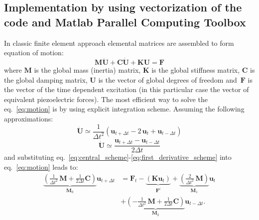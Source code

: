 \documentclass[preprint,12pt]{elsarticle}
\renewcommand{\vec}[1]{\mathbf{#1}}
\renewcommand{\bm}[1]{\mathbf{#1}}
\begin{document}
	\subsection{Implementation by using vectorization of the code and Matlab Parallel Computing Toolbox}
	In classic finite element approach elemental matrices are assembled to form equation of motion:
	\begin{equation}
	\bm{M} \vec{\ddot{U}} + \bm{C} \vec{\dot{U}} + \bm{K} \vec{U} = \vec{F} \label{eq:motion}
	\end{equation}  
	where $ \bm{M} $ is the global mass (inertia) matrix, $ \bm{K} $ is the global stiffness matrix,  $\bm{C} $ is the global damping matrix, $\vec{U}$ is the vector of global degrees of freedom and~$\vec{F}$ is the vector of the time dependent excitation (in this particular case the vector of equivalent piezoelectric forces). The most efficient way to solve the eq.~\ref{eq:motion} is by using explicit integration scheme. Assuming the following approximations:
	\begin{equation}
	\ddot{\vec{U}}\simeq \frac{1}{\Delta t^2} \left(\vec{u}_{t+\Delta t} - 2\,\vec{u}_t + \vec{u}_{t-\Delta t}\right) \label{eq:central_scheme}
	\end{equation}
	\begin{equation}
	\dot{\vec{U}}\simeq \frac{\vec{u}_{t+\Delta t} -\vec{u}_{t-\Delta t}}{2 \Delta t}
	\label{eq:first_derivative_scheme}
	\end{equation}
	and substituting eq.~\ref{eq:central_scheme}-\ref{eq:first_derivative_scheme} into eq.~\ref{eq:motion} leads to:
	\begin{equation}
	\begin{split}
	\underbrace{\left(\frac{1}{\Delta t^2} \,\bm{M} + \frac{1}{2 \Delta t} \bm{C}\right)}_{\vec{M}_0} \vec{u}_{t+\Delta t} &= \vec{F}_t - \underbrace{\left(\bm{K} \vec{u}_t\right)}_{\vec{F}^i} + \underbrace{\left(\frac{2}{\Delta t^2} \,\bm{M} \right)}_{\vec{M}_1}\vec{u}_t \\
	&+ \underbrace{\left(- \frac{1}{\Delta t^2} \,\bm{M} + \frac{1}{2 \Delta t} \bm{C}\right)}_{\vec{M}_2} \vec{u}_{t-\Delta t}.
	\label{eq:explicit_integration}
	\end{split}
	\end{equation}
\end{document}
